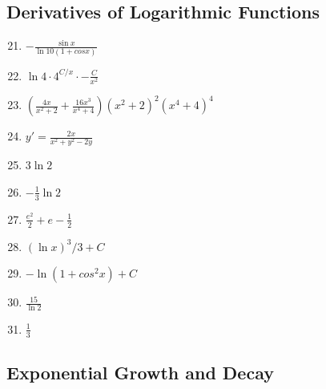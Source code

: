 \documentclass{article} \usepackage[margin=1in]{geometry}
\begin{document}
\subsection{Derivatives of Logarithmic Functions}
\begin{enumerate}
	\setcounter{enumi}{20}
	\item $-\frac{\sin{x}}{\ln{10}(1+cosx)}$
	      \setcounter{enumi}{24}
	\item $\ln4\cdot4^{C/x}\cdot-\frac{C}{x^2}$
	      \setcounter{enumi}{42}
	\item $\left(\frac{4x}{x^2+2}+\frac{16x^3}{x^4+4}\right)(x^2+2)^2(x^4+4)^4$
	      \setcounter{enumi}{54}
	\item $y'=\frac{2x}{x^2+y^2-2y}$
	      \setcounter{enumi}{70}
	\item $3\ln2$
	      \setcounter{enumi}{72}
	\item $-\frac{1}{3}\ln2$
	      \setcounter{enumi}{74}
	\item $\frac{e^2}{2}+e-\frac{1}{2}$
	      \setcounter{enumi}{76}
	\item $(\ln x)^3/3+C$
	      \setcounter{enumi}{78}
	\item $-\ln(1+cos^2x)+C$
	      \setcounter{enumi}{80}
	\item $\frac{15}{\ln2}$
	      \setcounter{enumi}{88}
	\item $\frac{1}{3}$
\end{enumerate}

\subsection{Exponential Growth and Decay}
\end{document}
